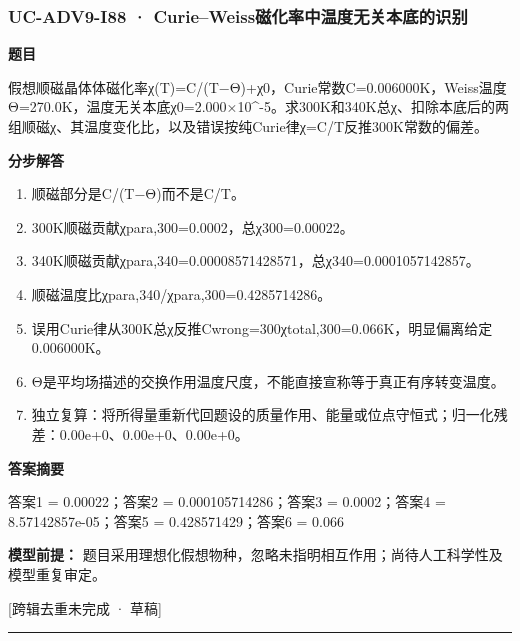 \documentclass[UTF8,11pt,a4paper]{ctexart}
\begin{document}
\subsubsection*{UC-ADV9-I88 · Curie–Weiss磁化率中温度无关本底的识别}
\noindent\textbf{题目}\par
假想顺磁晶体体磁化率χ(T)=C/(T−Θ)+χ0，Curie常数C=0.006000K，Weiss温度Θ=270.0K，温度无关本底χ0=2.000×10\textasciicircum{}-5。求300K和340K总χ、扣除本底后的两组顺磁χ、其温度变化比，以及错误按纯Curie律χ=C/T反推300K常数的偏差。\par
\medskip\noindent\textbf{分步解答}
\begin{enumerate}
\item 顺磁部分是C/(T−Θ)而不是C/T。
\item 300K顺磁贡献χpara,300=0.0002，总χ300=0.00022。
\item 340K顺磁贡献χpara,340=0.00008571428571，总χ340=0.0001057142857。
\item 顺磁温度比χpara,340/χpara,300=0.4285714286。
\item 误用Curie律从300K总χ反推Cwrong=300χtotal,300=0.066K，明显偏离给定0.006000K。
\item Θ是平均场描述的交换作用温度尺度，不能直接宣称等于真正有序转变温度。
\item 独立复算：将所得量重新代回题设的质量作用、能量或位点守恒式；归一化残差：0.00e+0、0.00e+0、0.00e+0。
\end{enumerate}
\noindent\textbf{答案摘要}\par
答案1 = 0.00022；答案2 = 0.000105714286；答案3 = 0.0002；答案4 = 8.57142857e-05；答案5 = 0.428571429；答案6 = 0.066\par
\noindent\textbf{模型前提：}
题目采用理想化假想物种，忽略未指明相互作用；尚待人工科学性及模型重复审定。\par
\noindent\textcolor{red!65!black}{[跨辑去重未完成 · 草稿]} \par
\medskip\hrule\medskip
{}
\end{document}
